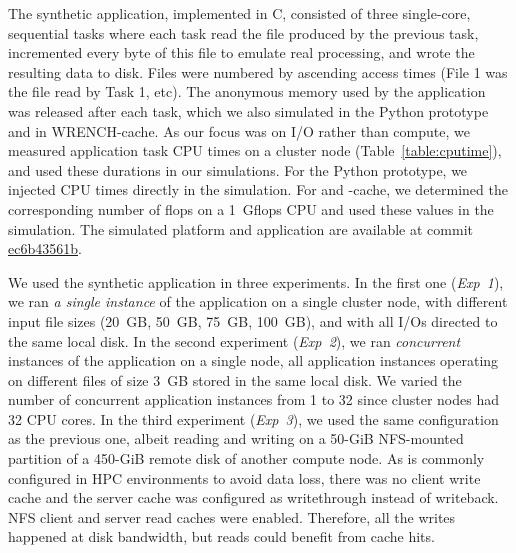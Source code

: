 The synthetic application, implemented in C, consisted of three single-core,
sequential tasks where each task read the file produced by the
previous task, incremented every byte of this file to emulate real
processing, and wrote the resulting data to disk. Files were
numbered by ascending access times (File 1 was the file read by Task 1, etc).
 The anonymous memory used by the application
was released after each task, which we also simulated in the Python
prototype and in WRENCH-cache. As our focus was on I/O rather than compute, we measured
application task CPU times on a cluster node
(Table~\ref{table:cputime}), and used these durations in our
simulations. For the Python prototype, we injected CPU times
directly in the simulation. For \wrench and \wrench-cache, we
determined the corresponding number of flops on a 1~Gflops CPU
and used these values in the simulation. The simulated
platform and application are available at
commit \href{https://github.com/wrench-project/wrench/tree/ec6b43561b95977002258c0fe37a4ecad8f1d33f/examples/basic-examples/io-pagecache}{ec6b43561b}.

We used the synthetic application in three experiments. In the
first one (\textit{Exp~1}), we ran \emph{a single instance} of
the application on a single cluster node, with different input file
sizes (20~GB, 50~GB, 75~GB, 100~GB), and with all I/Os directed to
the same local disk.
In the second experiment (\textit{Exp~2}), we ran
\emph{concurrent} instances of the application on a single node,
all application instances operating on different files of size 3~GB
stored in the same local disk. We varied the number of concurrent
application instances from 1 to 32 since cluster nodes had 32 CPU
cores.
In the third experiment (\textit{Exp~3}), we used the same
configuration as the previous one, albeit reading and writing
on a 50-GiB NFS-mounted partition of a 450-GiB remote disk of
another compute node. As is commonly configured in HPC
environments to avoid data loss, there was no client write cache
and the server cache was configured as writethrough instead of
writeback. NFS client and server read caches were enabled. 
Therefore, all the writes happened at disk bandwidth, but
reads could benefit from cache hits.

